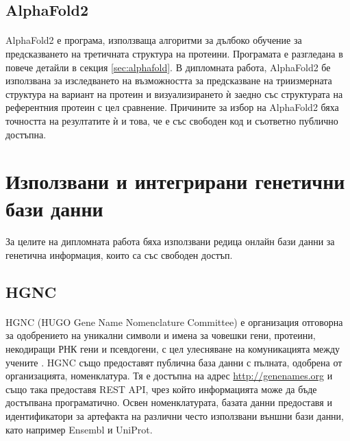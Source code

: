 \documentclass[pdftex,cyrillic,14pt,a4page,twoside,openright]{extreport}
\begin{document}
\subsection{AlphaFold2}
\paragraph{}
AlphaFold2 е програма, използваща алгоритми за дълбоко обучение за предсказването на третичната структура на протеини. Програмата е разгледана в повече детайли в секция \ref{sec:alphafold}. В дипломната работа, AlphaFold2 бе използвана за изследването на възможността за предсказване на триизмерната структура на вариант на протеин и визуализирането ѝ заедно със структурата на референтния протеин с цел сравнение. Причините за избор на AlphaFold2 бяха точността на резултатите ѝ и това, че е със свободен код и съответно публично достъпна.

\section[Използвани и интегрирани генетични бази данни]{Използвани и интегрирани генетични\\ бази данни}
\paragraph{}
За целите на дипломната работа бяха използвани редица онлайн бази данни за генетична информация, които са със свободен достъп.

\subsection{HGNC}\label{sec:hgnc}
\paragraph{}
HGNC (HUGO Gene Name Nomenclature Committee) е организация отговорна за одобрението на уникални символи и имена за човешки гени, протеини, некодиращи РНК гени и псевдогени, с цел улесняване на комуникацията между учените \cite{povey2001hugo}. HGNC също предоставят публична база данни с пълната, одобрена от организацията, номенклатура. Тя е достъпна на адрес \url{http://genenames.org} и също така предоставя REST API, чрез който информацията може да бъде достъпвана програматично. Освен номенклатурата, базата данни предоставя и идентификатори за артефакта на различни често използвани външни бази данни, като например Ensembl и UniProt.
\end{document}
